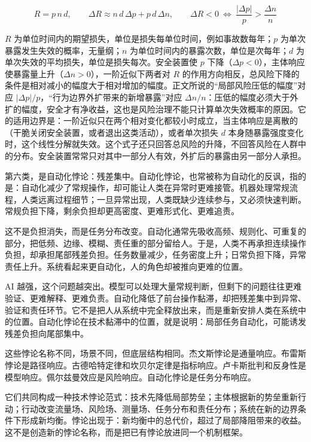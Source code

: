 \begin{equation}
R=p\,n\,d,
\qquad
\Delta R\approx n\,d\,\Delta p+p\,d\,\Delta n,
\qquad
\Delta R<0\ \Longleftrightarrow\ \frac{|\Delta p|}{p}>\frac{\Delta n}{n}
\end{equation}

$R$ 为单位时间内的期望损失，单位是损失每单位时间，例如事故数每年；$p$ 为单次暴露发生失效的概率，无量纲；$n$ 为单位时间内的暴露次数，单位是次每年；$d$ 为单次失效的平均损失，单位是损失每次。安全装置使 $p$ 下降（$\Delta p<0$），主体响应使暴露量上升（$\Delta n>0$），一阶近似下两者对 $R$ 的作用方向相反，总风险下降的条件是相对减小的幅度大于相对增加的幅度。正文所说的“局部风险压低的幅度”对应 $|\Delta p|/p$，“行为边界外扩带来的新增暴露”对应 $\Delta n/n$：压低的幅度必须大于外扩的幅度，安全才有净收益，这也是风险治理不能只计算单次失效概率的原因。它的适用边界是：一阶近似只在两个相对变化都较小时成立，当主体响应是离散的（干脆关闭安全装置，或者退出这类活动），或者单次损失 $d$ 本身随暴露强度变化时，这个线性分解就失效。这个式子还只回答总风险的升降，不回答风险在人群中的分布。安全装置常常只对其中一部分人有效，外扩后的暴露由另一部分人承担。

第六类，是自动化悖论：残差集中。自动化悖论，也常被称为自动化的反讽，指的是：自动化减少了常规操作，却可能让人类在异常时更难接管。机器处理常规流程，人类远离过程细节；一旦异常出现，人类既缺少连续参与，又必须快速判断。常规负担下降，剩余负担却更高密度、更难形式化、更难追责。\cite{bainbridge1983ironies}

这不是负担消失，而是任务分布改变。自动化通常先吸收高频、规则化、可重复的部分，把低频、边缘、模糊、责任重的部分留给人。于是，人类不再承担连续操作负担，却承担尾部残差负担。任务数量减少，任务密度上升；日常负担下降，异常责任上升。系统看起来更自动化，人的角色却被推向更难的位置。

AI 越强，这个问题越突出。模型可以处理大量常规判断，但剩下的问题往往更难验证、更难解释、更难负责。自动化降低了前台操作黏滞，却把残差集中到异常、验证和责任环节。它不是把人从系统中完全释放出来，而是重新安排人类在系统中的位置。自动化悖论在技术黏滞中的位置，就是说明：局部任务自动化，可能诱发残差负担向尾部集中。


这些悖论名称不同，场景不同，但底层结构相同。杰文斯悖论是通量响应。布雷斯悖论是路径响应。古德哈特定律和坎贝尔定律是指标响应。卢卡斯批判和反身性是模型响应。佩尔兹曼效应是风险响应。自动化悖论是任务分布响应。

它们共同构成一种技术悖论范式：技术先降低局部势垒；主体根据新的势垒重新行动；行动改变流量场、风险场、测量场、任务分布和责任分布；系统在新的边界条件下形成新均衡。悖论出现于：新均衡中的总代价，超过了局部降阻带来的收益。这不是创造新的悖论名称，而是把已有悖论放进同一个机制框架。

